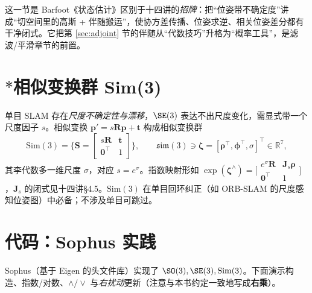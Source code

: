 \begin{insight}
这一节是 Barfoot《状态估计》区别于十四讲的\emph{招牌}：把“位姿带不确定度”讲成“切空间里的高斯 + 伴随搬运”，使协方差传播、位姿求逆、相关位姿差分都有干净闭式。它把第 \ref{sec:adjoint} 节的伴随从“代数技巧”升格为“概率工具”，是滤波/平滑章节的前置。
\end{insight}

\section{\texorpdfstring{$*$}{*}相似变换群 Sim(3)}
\label{sec:sim3}

单目 SLAM 存在\emph{尺度不确定性与漂移}，$\SE(3)$ 表达不出尺度变化，需显式带一个尺度因子 $s$。相似变换 $\mathbf{p}'=s\mathbf{R}\mathbf{p}+\mathbf{t}$ 构成相似变换群
\begin{equation}
  \mathrm{Sim}(3)=\Big\{\mathbf{S}=\begin{bmatrix}s\mathbf{R}&\mathbf{t}\\\mathbf{0}^\top&1\end{bmatrix}\Big\},\qquad
  \mathfrak{sim}(3)\ni\boldsymbol{\zeta}=[\boldsymbol{\rho}^\top,\boldsymbol{\phi}^\top,\sigma]^\top\in\mathbb{R}^7,
  \label{eq:sim3}
\end{equation}
其李代数多一维尺度 $\sigma$，对应 $s=e^{\sigma}$。指数映射形如 $\exp(\boldsymbol{\zeta}^\wedge)=\big[\begin{smallmatrix}e^{\sigma}\mathbf{R}&\mathbf{J}_s\boldsymbol{\rho}\\\mathbf{0}^\top&1\end{smallmatrix}\big]$，$\mathbf{J}_s$ 的闭式见十四讲\cite{gaoxiang2019slam14}§4.5。$\mathrm{Sim}(3)$ 在单目回环纠正（如 ORB-SLAM 的尺度感知位姿图）中必备；不涉及单目可跳过。

\section{代码：Sophus 实践}
\label{sec:sophus}

Sophus（基于 Eigen 的头文件库）实现了 $\SO(3),\SE(3),\mathrm{Sim}(3)$。下面演示构造、指数/对数、$\wedge/\vee$ 与\emph{右扰动}更新（注意与本书约定一致地写成\textbf{右乘}）。

